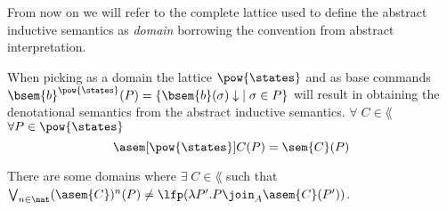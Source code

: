 %     
% 
% 
% 
% 
% 

From now on we will refer to the complete lattice used to define the abstract
inductive semantics as \textit{domain} borrowing the convention from abstract
interpretation.

\begin{observation}
  When picking as a domain the lattice $\pow{\states}$ and as base commands
  $\bsem{b}^{\pow{\states}}(P) = \{ \bsem{b}(\sigma)\downarrow \; \mid \sigma 
  \in P \}$ will result in obtaining the denotational semantics from the 
  abstract inductive semantics. $\forall \; C \in \lang$ $\forall P \in 
  \pow{\states}$ 
  $$\asem[\pow{\states}]{C}(P) = \sem{C}(P)$$
\end{observation}

\begin{observation}
  \label{obs:abstract-fix}
  There are some domains where $\exists \; C \in \lang$ such that
  $\bigvee_{n \in \nat} (\asem{C})^n(P) \neq \lfp(\lambda P'. P \join_A
  \asem{C}(P'))$.
\end{observation}

